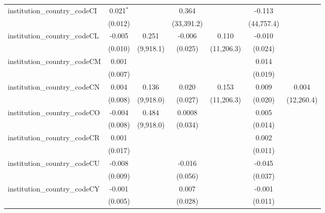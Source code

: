 \begin{tabular}{lcccccc}
   institution\_country\_codeCI          & 0.021$^{*}$    &               & 0.364         &              & -0.113       &   \\   
                                         & (0.012)        &               & (33,391.2)    &              & (44,757.4)   &   \\   
   institution\_country\_codeCL          & -0.005         & 0.251         & -0.006        & 0.110        & -0.010       &   \\   
                                         & (0.010)        & (9,918.1)     & (0.025)       & (11,206.3)   & (0.024)      &   \\   
   institution\_country\_codeCM          & 0.001          &               &               &              & 0.014        &   \\   
                                         & (0.007)        &               &               &              & (0.019)      &   \\   
   institution\_country\_codeCN          & 0.004          & 0.136         & 0.020         & 0.153        & 0.009        & 0.004\\   
                                         & (0.008)        & (9,918.0)     & (0.027)       & (11,206.3)   & (0.020)      & (12,260.4)\\   
   institution\_country\_codeCO          & -0.004         & 0.484         & 0.0008        &              & 0.005        &   \\   
                                         & (0.008)        & (9,918.0)     & (0.034)       &              & (0.014)      &   \\   
   institution\_country\_codeCR          & 0.001          &               &               &              & 0.002        &   \\   
                                         & (0.017)        &               &               &              & (0.011)      &   \\   
   institution\_country\_codeCU          & -0.008         &               & -0.016        &              & -0.045       &   \\   
                                         & (0.009)        &               & (0.056)       &              & (0.037)      &   \\   
   institution\_country\_codeCY          & -0.001         &               & 0.007         &              & -0.001       &   \\   
                                         & (0.005)        &               & (0.028)       &              & (0.011)      &   \\   

\end{tabular}
